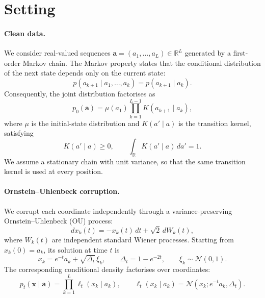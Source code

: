 \section{Setting}
\label{sec:setting}


\paragraph{Clean data.}
We consider real-valued sequences
$\mathbf{a}=(a_1,\ldots,a_L)\in\mathbb{R}^L$
generated by a first-order Markov chain. The Markov property
states that the conditional distribution of the next state
depends only on the current state:
\begin{equation}
p(a_{k+1}\mid a_1,\ldots,a_k)
=
p(a_{k+1}\mid a_k).
\end{equation}
Consequently, the joint distribution factorises as
\begin{equation}
p_0(\mathbf{a})
=
\mu(a_1)
\prod_{k=1}^{L-1}
K(a_{k+1}\mid a_k),
\label{eq:markov_prior}
\end{equation}
where $\mu$ is the initial-state distribution and
$K(a'\mid a)$ is the transition kernel, satisfying
\begin{equation}
K(a'\mid a)\geq 0,
\qquad
\int_{\mathbb{R}} K(a'\mid a)\,da'=1.
\end{equation}
We assume a stationary chain with unit variance, so that
the same transition kernel is used at every position.

\paragraph{Ornstein--Uhlenbeck corruption.}
We corrupt each coordinate independently through a
variance-preserving Ornstein--Uhlenbeck (OU) process:
\begin{equation}
dx_k(t)=-x_k(t)\,dt+\sqrt{2}\,dW_k(t),
\end{equation}
where $W_k(t)$ are independent standard Wiener processes.
Starting from $x_k(0)=a_k$, its solution at time $t$ is
\begin{equation}
x_k=e^{-t}a_k+\sqrt{\Delta_t}\,\xi_k,
\qquad
\Delta_t=1-e^{-2t},
\qquad
\xi_k\sim\mathcal{N}(0,1).
\label{eq:ou_corruption}
\end{equation}
The corresponding conditional density factorises over
coordinates:
\begin{equation}
p_t(\mathbf{x}\mid\mathbf{a})
=
\prod_{k=1}^{L}
\ell_t(x_k\mid a_k),
\qquad
\ell_t(x_k\mid a_k)
=
\mathcal{N}(x_k;e^{-t}a_k,\Delta_t).
\label{eq:ou_likelihood}
\end{equation}

